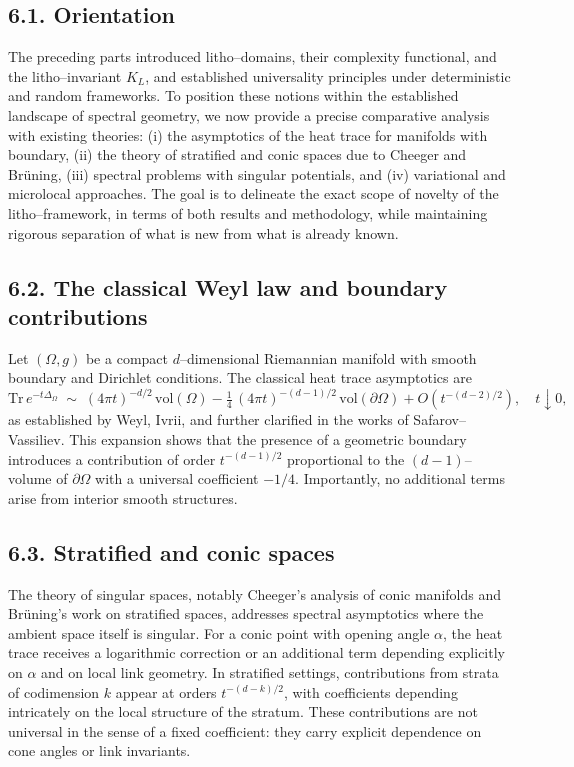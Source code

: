 \subsection*{6.1. Orientation}
The preceding parts introduced litho–domains, their complexity functional, and the litho–invariant $K_L$, and established universality principles under deterministic and random frameworks. To position these notions within the established landscape of spectral geometry, we now provide a precise comparative analysis with existing theories: (i) the asymptotics of the heat trace for manifolds with boundary, (ii) the theory of stratified and conic spaces due to Cheeger and Brüning, (iii) spectral problems with singular potentials, and (iv) variational and microlocal approaches. The goal is to delineate the exact scope of novelty of the litho–framework, in terms of both results and methodology, while maintaining rigorous separation of what is new from what is already known.

\subsection*{6.2. The classical Weyl law and boundary contributions}
Let $(\Omega,g)$ be a compact $d$–dimensional Riemannian manifold with smooth boundary and Dirichlet conditions. The classical heat trace asymptotics are
\[
\mathrm{Tr}\,e^{-t\Delta_\Omega}
\;\sim\;(4\pi t)^{-d/2}\,\mathrm{vol}(\Omega)
-\tfrac14\,(4\pi t)^{-(d-1)/2}\,\mathrm{vol}(\partial\Omega)
+O(t^{-(d-2)/2}),
\quad t\downarrow0,
\]
as established by Weyl, Ivrii, and further clarified in the works of Safarov–Vassiliev. This expansion shows that the presence of a geometric boundary introduces a contribution of order $t^{-(d-1)/2}$ proportional to the $(d-1)$–volume of $\partial\Omega$ with a universal coefficient $-1/4$. Importantly, no additional terms arise from interior smooth structures.

\subsection*{6.3. Stratified and conic spaces}
The theory of singular spaces, notably Cheeger’s analysis of conic manifolds and Brüning’s work on stratified spaces, addresses spectral asymptotics where the ambient space itself is singular. For a conic point with opening angle $\alpha$, the heat trace receives a logarithmic correction or an additional term depending explicitly on $\alpha$ and on local link geometry. In stratified settings, contributions from strata of codimension $k$ appear at orders $t^{-(d-k)/2}$, with coefficients depending intricately on the local structure of the stratum. These contributions are not universal in the sense of a fixed coefficient: they carry explicit dependence on cone angles or link invariants.

